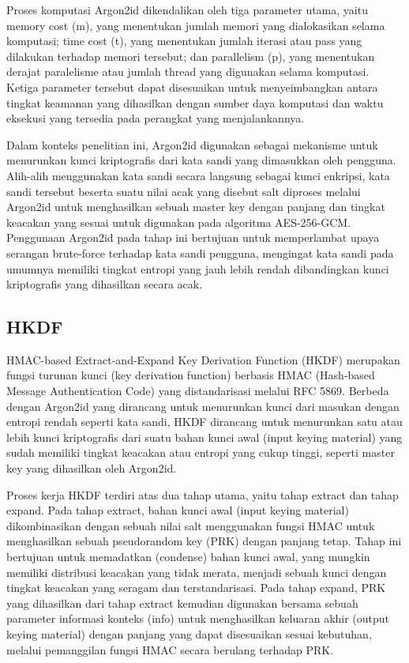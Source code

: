 Proses komputasi Argon2id dikendalikan oleh tiga parameter utama, yaitu memory cost (m), yang menentukan jumlah memori yang dialokasikan selama komputasi; time cost (t), yang menentukan jumlah iterasi atau pass yang dilakukan terhadap memori tersebut; dan parallelism (p), yang menentukan derajat paralelisme atau jumlah thread yang digunakan selama komputasi\cite{}. Ketiga parameter tersebut dapat disesuaikan untuk menyeimbangkan antara tingkat keamanan yang dihasilkan dengan sumber daya komputasi dan waktu eksekusi yang tersedia pada perangkat yang menjalankannya.

Dalam konteks penelitian ini, Argon2id digunakan sebagai mekanisme untuk menurunkan kunci kriptografis dari kata sandi yang dimasukkan oleh pengguna. Alih-alih menggunakan kata sandi secara langsung sebagai kunci enkripsi, kata sandi tersebut beserta suatu nilai acak yang disebut salt diproses melalui Argon2id untuk menghasilkan sebuah master key dengan panjang dan tingkat keacakan yang sesuai untuk digunakan pada algoritma AES-256-GCM. Penggunaan Argon2id pada tahap ini bertujuan untuk memperlambat upaya serangan brute-force terhadap kata sandi pengguna, mengingat kata sandi pada umumnya memiliki tingkat entropi yang jauh lebih rendah dibandingkan kunci kriptografis yang dihasilkan secara acak\cite{}.

\subsection{HKDF}
HMAC-based Extract-and-Expand Key Derivation Function (HKDF) merupakan fungsi turunan kunci (key derivation function) berbasis HMAC (Hash-based Message Authentication Code) yang distandarisasi melalui RFC 5869\cite{}. Berbeda dengan Argon2id yang dirancang untuk menurunkan kunci dari masukan dengan entropi rendah seperti kata sandi, HKDF dirancang untuk menurunkan satu atau lebih kunci kriptografis dari suatu bahan kunci awal (input keying material) yang sudah memiliki tingkat keacakan atau entropi yang cukup tinggi, seperti master key yang dihasilkan oleh Argon2id\cite{}.

Proses kerja HKDF terdiri atas dua tahap utama, yaitu tahap extract dan tahap expand\cite{}. Pada tahap extract, bahan kunci awal (input keying material) dikombinasikan dengan sebuah nilai salt menggunakan fungsi HMAC untuk menghasilkan sebuah pseudorandom key (PRK) dengan panjang tetap. Tahap ini bertujuan untuk memadatkan (condense) bahan kunci awal, yang mungkin memiliki distribusi keacakan yang tidak merata, menjadi sebuah kunci dengan tingkat keacakan yang seragam dan terstandarisasi\cite{}. Pada tahap expand, PRK yang dihasilkan dari tahap extract kemudian digunakan bersama sebuah parameter informasi konteks (info) untuk menghasilkan keluaran akhir (output keying material) dengan panjang yang dapat disesuaikan sesuai kebutuhan, melalui pemanggilan fungsi HMAC secara berulang terhadap PRK\cite{}.

